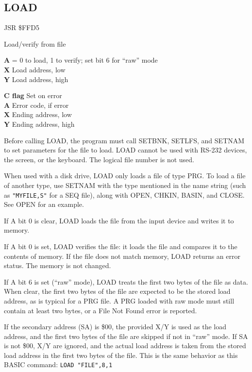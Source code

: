 \subsection{LOAD}
\label{KERNAL Jump Table!LOAD}
\begin{description}[leftmargin=2cm,style=nextline]
    \item [Address:] JSR \$FFD5
    \item [Description:] Load/verify from file
    \item [Inputs:]
        \textbf{A} = 0 to load, 1 to verify; set bit 6 for ``raw'' mode \\
        \textbf{X} Load address, low \\
        \textbf{Y} Load address, high
    \item [Outputs:]
        \textbf{C flag} Set on error \\
        \textbf{A} Error code, if error \\
        \textbf{X} Ending address, low \\
        \textbf{Y} Ending address, high
    \item [Remarks:]
        Before calling LOAD, the program must call SETBNK, SETLFS, and SETNAM to set parameters for the file to load. LOAD cannot be used with RS-232 devices, the screen, or the keyboard. The logical file number is not used.

        When used with a disk drive, LOAD only loads a file of type PRG. To load a file of another type, use SETNAM with the type mentioned in the name string (such as \texttt{"MYFILE,S"} for a SEQ file), along with OPEN, CHKIN, BASIN, and CLOSE. See OPEN for an example.

        If A bit 0 is clear, LOAD loads the file from the input device and writes it to memory.

        If A bit 0 is set, LOAD verifies the file: it loads the file and compares it to the contents of memory. If the file does not match memory, LOAD returns an error status. The memory is not changed.

        If A bit 6 is set (``raw'' mode), LOAD treats the first two bytes of the file as data. When clear, the first two bytes of the file are expected to be the stored load address, as is typical for a PRG file. A PRG loaded with raw mode must still contain at least two bytes, or a File Not Found error is reported.

        If the secondary address (SA) is \$00, the provided X/Y is used as the load address, and the first two bytes of the file are skipped if not in ``raw'' mode. If SA is not \$00, X/Y are ignored, and the actual load address is taken from the stored load address in the first two bytes of the file. This is the same behavior as this BASIC command: \texttt{LOAD "FILE",8,1}


\end{description}
